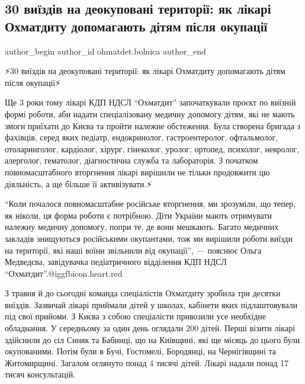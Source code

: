  
 
 
 
 
 
\subsection{30 виїздів на деокуповані території: як лікарі Охматдиту допомагають дітям після окупації}
\label{sec:13_12_2022.fb.ohmatdet.bolnica.1.vyizdy}
 
\ifcmt
 author_begin
   author_id ohmatdet.bolnica
 author_end
\fi

⚡️30 виїздів на деокуповані території: як лікарі Охматдиту допомагають дітям після окупації⚡️

Ще 3 роки тому лікарі КДП НДСЛ \enquote{Охматдит} започаткували проєкт по виїзній формі
роботи, аби надати спеціалізовану медичну допомогу дітям, які не мають змоги
приїхати до Києва та пройти належне обстеження. Була створена бригада з
фахівців, серед яких педіатр, ендокринолог, гастроентеролог, офтальмолог,
отоларинголог, кардіолог, хірург, гінеколог, уролог, ортопед, психолог,
невролог, алерголог, гематолог, діагностична служба та лабораторія. З початком
повномасштабного вторгнення лікарі вирішили не тільки продовжити цю діяльність,
а ще більше її активізувати.⚡️

\enquote{Коли почалося повномасштабне російське вторгнення, ми зрозуміли, що тепер, як
ніколи, ця форма роботи є потрібною. Діти України мають отримувати належну
медичну допомогу, попри те, де вони мешкають. Багато медичних закладів
знищуються російськими окупантами, тож ми вирішили роботи виїзди на території,
які наші воїни звільнили від окупації}, — пояснює Ольга Медведєва, завідувачка
педіатричного відділення КДП НДСЛ \enquote{Охматдит}.@igg{fbicon.heart.red}


З травня й до сьогодні команда спеціалістів Охматдиту зробила три десятки
виїздів. Зазвичай лікарі приймали дітей у школах, кабінети яких підлаштовували
під свої прийоми. З Києва з собою спеціалісти привозили усе необхідне
обладнання. У середньому за один день оглядали 200 дітей. Перші візити лікарі
здійснили до сіл Синяк та Бабинці, що на Київщині, які ще місяць до цього були
окупованими. Потім були в Бучі, Гостомелі, Бородянці, на Чернігівщині та
Житомирщині. Загалом оглянуто понад 4 тисячі дітей. Лікарі надали понад 17
тисяч консультацій.🙌🏻

